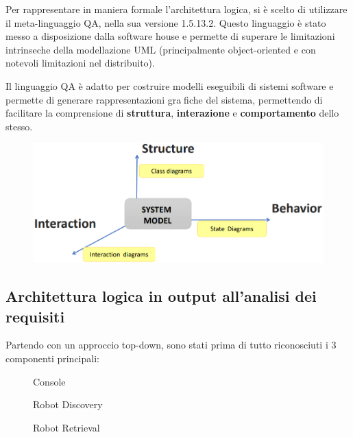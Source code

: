 Per rappresentare in maniera formale l'architettura logica, si è scelto di utilizzare il meta-linguaggio QA, nella sua versione 1.5.13.2.
Questo linguaggio è stato messo a disposizione dalla software house e permette di superare le limitazioni intrinseche della modellazione UML
(principalmente object-oriented e con notevoli limitazioni nel distribuito).

Il linguaggio QA è adatto per costruire modelli eseguibili di sistemi software e permette di generare rappresentazioni grafiche del sistema,
permettendo di facilitare la comprensione di \textbf{struttura}, \textbf{interazione} e \textbf{comportamento} dello stesso.

\begin{figure}[H]
  \centering
  \includegraphics[width=1\textwidth]{res/logicalArchitecture.png}%
  \label{fig:logicalArchitecture}
\end{figure}

\subsection{Architettura logica in output all'analisi dei requisiti}

Partendo con un approccio top-down, sono stati prima di tutto riconosciuti i 3 componenti principali:

\begin{figure}[H]
  \centering
  \caption{Console}%
  \label{fig:sp1:req:console}
\end{figure}

\begin{figure}[H]
  \centering
  \caption{Robot Discovery}%
  \label{fig:sp1:req:robotdiscovery}
\end{figure}

\begin{figure}[H]
  \centering
  \caption{Robot Retrieval}%
  \label{fig:sp1:req:robotretrieval}
\end{figure}

